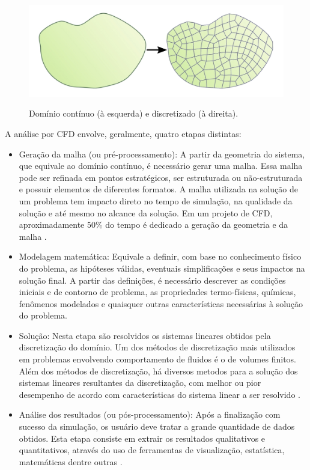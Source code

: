 \begin{figure}[htb]
  \caption[Domínio contínuo e discretizado.]{Domínio contínuo (à esquerda) e discretizado (à direita).}
  \centering\includegraphics[scale=1.3]{figuras/dom.png}
  \label{fig:dom}
\end{figure}

A análise por CFD envolve, geralmente, quatro etapas distintas:

\begin{itemize}
\item Geração da malha (ou pré-processamento): A partir da geometria do sistema, que equivale ao
  domínio contínuo, é necessário gerar uma malha. Essa malha pode ser refinada
  em pontos estratégicos, ser estruturada ou não-estruturada e possuir elementos
  de diferentes formatos. A malha utilizada na solução de um problema tem impacto
  direto no tempo de simulação, na qualidade da solução e até mesmo no alcance
  da solução. Em um projeto de CFD, aproximadamente 50\% do tempo é dedicado a geração
  da geometria e da malha \cite{Versteeg2007}.
\item Modelagem matemática: Equivale a definir, com base no conhecimento
  físico do problema, as hipóteses válidas, eventuais simplificações e
  seus impactos na solução final. A partir das definições, é necessário
  descrever as condições iniciais e de contorno de problema, as propriedades
  termo-físicas, químicas, fenômenos modelados e quaisquer outras características
  necessárias à solução do problema.
\item Solução: Nesta etapa são resolvidos os sistemas lineares obtidos pela
  discretização do domínio. Um dos métodos de discretização mais utilizados
  em problemas envolvendo comportamento de fluidos é o de volumes finitos. Além dos
  métodos de discretização, há diversos metodos para a solução dos sistemas
  lineares resultantes da discretização, com melhor ou pior desempenho de
  acordo com características do sistema linear a ser resolvido \cite{Barrett1994}.
\item Análise dos resultados (ou pós-processamento): Após a finalização
  com sucesso da simulação, os usuário deve tratar a grande quantidade de
  dados obtidos. Esta etapa consiste em extrair os resultados qualitativos
  e quantitativos, através do uso de ferramentas de visualização, estatística,
  matemáticas dentre outras \cite{Maric2014}.
\end{itemize}

